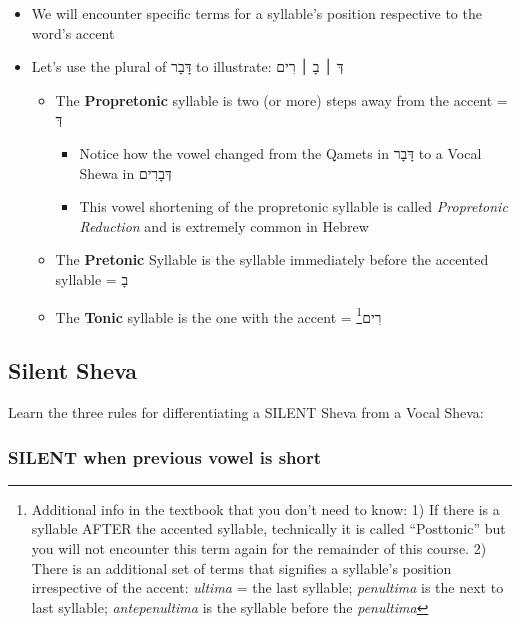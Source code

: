 \documentclass[
]{turabian-researchpaper}
\providecommand{\tightlist}{%
  \setlength{\itemsep}{0pt}\setlength{\parskip}{0pt}}
\begin{document}
\begin{itemize}
\tightlist
\item
  We will encounter specific terms for a syllable's position respective to the word's accent
\item
  Let's use the plural of דָּבָר to illustrate: דְּ ׀ בָ ׀ רִים

  \begin{itemize}
  \tightlist
  \item
    The \textbf{Propretonic} syllable is two (or more) steps away from the accent = דְּ

    \begin{itemize}
    \tightlist
    \item
      Notice how the vowel changed from the Qamets in דָּבָר to a Vocal Shewa in דְּבָרִים
    \item
      This vowel shortening of the propretonic syllable is called \emph{Propretonic Reduction} and is extremely common in Hebrew
    \end{itemize}
  \item
    The \textbf{Pretonic} Syllable is the syllable immediately before the accented syllable = בָ
  \item
    The \textbf{Tonic} syllable is the one with the accent = רִים\footnote{Additional info in the textbook that you don't need to know: 1) If there is a syllable AFTER the accented syllable, technically it is called ``Posttonic'' but you will not encounter this term again for the remainder of this course. 2) There is an additional set of terms that signifies a syllable's position irrespective of the accent: \emph{ultima} = the last syllable; \emph{penultima} is the next to last syllable; \emph{antepenultima} is the syllable before the \emph{penultima}}
  \end{itemize}
\end{itemize}

\hypertarget{three_3}{%
\subsection{Silent Sheva}\label{three_3}}

Learn the three rules for differentiating a SILENT Sheva from a Vocal Sheva:

\hypertarget{silent-when-previous-vowel-is-short}{%
\subsubsection*{SILENT when previous vowel is short}\label{silent-when-previous-vowel-is-short}}
\end{document}

